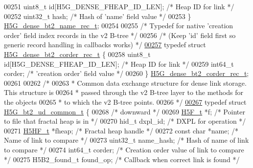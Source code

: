 \begin{DoxyCode}
00251     uint8\_t \textcolor{keywordtype}{id}[H5G\_DENSE\_FHEAP\_ID\_LEN]; \textcolor{comment}{/* Heap ID for link */}
00252     uint32\_t hash;                      \textcolor{comment}{/* Hash of 'name' field value */}
00253 \} \hyperlink{struct_h5_g__dense__bt2__name__rec__t}{H5G\_dense\_bt2\_name\_rec\_t};
00254 
00255 \textcolor{comment}{/* Typedef for native 'creation order' field index records in the v2 B-tree */}
00256 \textcolor{comment}{/* (Keep 'id' field first so generic record handling in callbacks works) */}
\hyperlink{struct_h5_g__dense__bt2__corder__rec__t}{00257} \textcolor{keyword}{typedef} \textcolor{keyword}{struct }\hyperlink{struct_h5_g__dense__bt2__corder__rec__t}{H5G\_dense\_bt2\_corder\_rec\_t} \{
00258     uint8\_t \textcolor{keywordtype}{id}[H5G\_DENSE\_FHEAP\_ID\_LEN]; \textcolor{comment}{/* Heap ID for link */}
00259     int64\_t corder;                     \textcolor{comment}{/* 'creation order' field value */}
00260 \} \hyperlink{struct_h5_g__dense__bt2__corder__rec__t}{H5G\_dense\_bt2\_corder\_rec\_t};
00261 
00262 \textcolor{comment}{/*}
00263 \textcolor{comment}{ * Common data exchange structure for dense link storage.  This structure is}
00264 \textcolor{comment}{ * passed through the v2 B-tree layer to the methods for the objects}
00265 \textcolor{comment}{ * to which the v2 B-tree points.}
00266 \textcolor{comment}{ */}
\hyperlink{struct_h5_g__bt2__ud__common__t}{00267} \textcolor{keyword}{typedef} \textcolor{keyword}{struct }\hyperlink{struct_h5_g__bt2__ud__common__t}{H5G\_bt2\_ud\_common\_t} \{
00268     \textcolor{comment}{/* downward */}
00269     \hyperlink{struct_h5_f__t}{H5F\_t}       *f;                     \textcolor{comment}{/* Pointer to file that fractal heap is in */}
00270     hid\_t       dxpl\_id;                \textcolor{comment}{/* DXPL for operation                */}
00271     \hyperlink{struct_h5_h_f__t}{H5HF\_t}      *fheap;                 \textcolor{comment}{/* Fractal heap handle               */}
00272     \textcolor{keyword}{const} \textcolor{keywordtype}{char}  *name;                  \textcolor{comment}{/* Name of link to compare           */}
00273     uint32\_t    name\_hash;              \textcolor{comment}{/* Hash of name of link to compare   */}
00274     int64\_t     corder;                 \textcolor{comment}{/* Creation order value of link to compare   */}
00275     H5B2\_found\_t found\_op;              \textcolor{comment}{/* Callback when correct link is found */}

\end{DoxyCode}
